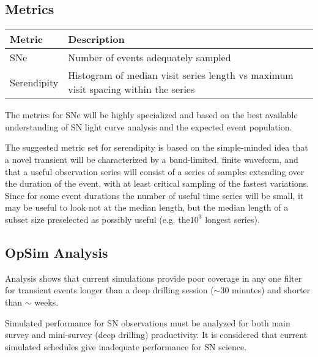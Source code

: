 
\subsection{Metrics}
\label{sec:keyword:metrics}

\begin{center} 
\begin{tabular}{| p{5cm} |p{10cm} |}
\hline Metric & Description\\
\hline
SNe & Number of events adequately sampled\\ 
Serendipity & Histogram of median visit series length vs maximum visit spacing within the series\\
  \hline \end{tabular} 
 \end{center}	

The metrics for SNe will be highly specialized and based on the best available understanding of SN light curve analysis and the expected event population.

The suggested metric set for serendipity is based on the simple-minded idea that a novel transient will be characterized by a band-limited, finite waveform, and that a useful observation series will consist of a series of samples extending over the duration of the event, with at least critical sampling of the fastest variations.  Since for some event durations the number of useful time series will be small, it may be useful to look not at the median length, but the median length of a subset size preselected as possibly useful (e.g. the$10^3$ longest series).


\subsection{OpSim Analysis}
\label{sec:keyword:analysis}

Analysis shows that current simulations provide  poor coverage in any one filter for transient events longer than a deep drilling session ($\sim$30 minutes) and shorter than $\sim$ weeks.  

Simulated performance for SN observations must be analyzed for both main survey and mini-survey (deep drilling) productivity.  It is considered that current simulated schedules give inadequate performance for SN science.



